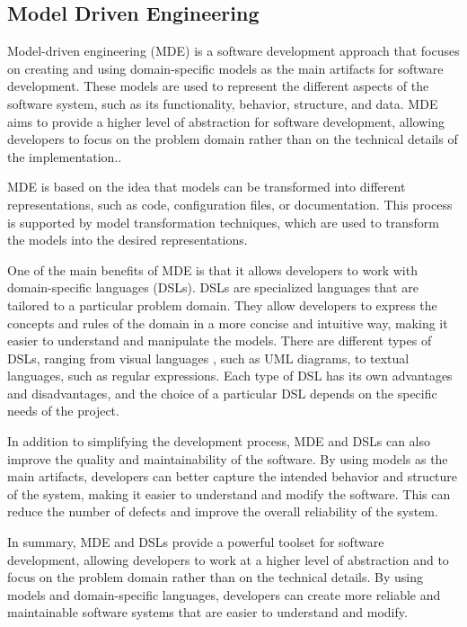 
\subsection{Model Driven Engineering}
Model-driven engineering (MDE) is a software development approach that focuses on creating and using domain-specific models as the main artifacts for software development. These models are used to represent the different aspects of the software system, such as its functionality, behavior, structure, and data. MDE aims to provide a higher level of abstraction for software development, allowing developers to focus on the problem domain rather than on the technical details of the implementation\cite{methodologyBasedMDE}..

MDE is based on the idea that models can be transformed into different representations, such as code, configuration files, or documentation. This process is supported by model transformation techniques, which are used to transform the models into the desired representations.

One of the main benefits of MDE is that it allows developers to work with domain-specific languages (DSLs). DSLs are specialized languages that are tailored to a particular problem domain. They allow developers to express the concepts and rules of the domain in a more concise and intuitive way, making it easier to understand and manipulate the models.
There are different types of DSLs, ranging from visual languages \cite{designDSLandIDEforIOTa}, such as UML diagrams, to textual languages, such as regular expressions. Each type of DSL has its own advantages and disadvantages, and the choice of a particular DSL depends on the specific needs of the project.

In addition to simplifying the development process, MDE and DSLs can also improve the quality and maintainability of the software. By using models as the main artifacts, developers can better capture the intended behavior and structure of the system\cite{MDE4IOT}, making it easier to understand and modify the software. This can reduce the number of defects and improve the overall reliability of the system.

In summary, MDE and DSLs provide a powerful toolset for software development, allowing developers to work at a higher level of abstraction and to focus on the problem domain rather than on the technical details. By using models and domain-specific languages, developers can create more reliable and maintainable software systems that are easier to understand and modify.

